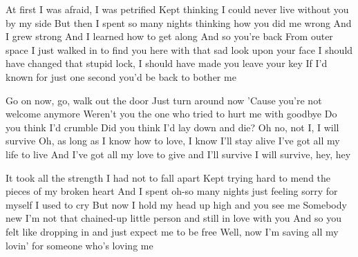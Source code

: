 \begin{verse*}
At first I was afraid, I was petrified
Kept thinking I could never live without you by my side
But then I spent so many nights thinking how you did me wrong
And I grew strong
And I learned how to get along
And so you're back
From outer space
I just walked in to find you here with that sad look upon your face
I should have changed that stupid lock, I should have made you leave your key
If I'd known for just one second you'd be back to bother me
\end{verse*}

\begin{chorus}
Go on now, go, walk out the door
Just turn around now
'Cause you're not welcome anymore
Weren't you the one who tried to hurt me with goodbye
Do you think I'd crumble
Did you think I'd lay down and die?
Oh no, not I, I will survive
Oh, as long as I know how to love, I know I'll stay alive
I've got all my life to live
And I've got all my love to give and I'll survive
I will survive, hey, hey
\end{chorus}

\begin{verse*}
It took all the strength I had not to fall apart
Kept trying hard to mend the pieces of my broken heart
And I spent oh-so many nights just feeling sorry for myself
I used to cry
But now I hold my head up high and you see me
Somebody new
I'm not that chained-up little person and still in love with you
And so you felt like dropping in and just expect me to be free
Well, now I'm saving all my lovin' for someone who's loving me
\end{verse*}

\thechorus[2]